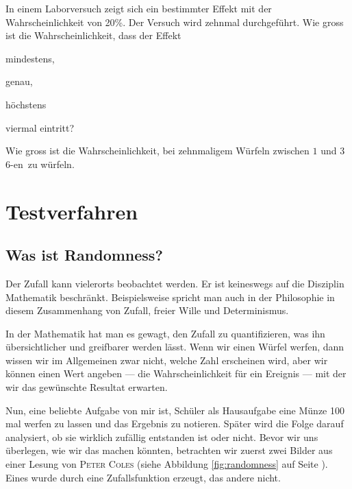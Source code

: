 \documentclass[%
11pt,%
twoside,%
titlepage,%
german,%
headsepline%
]{scrartcl}
\begin{document}
\begin{ueb}
In einem Laborversuch zeigt sich ein bestimmter Effekt mit der Wahrscheinlichkeit von 20\%. Der Versuch wird zehnmal durchgeführt. Wie gross ist die Wahrscheinlichkeit, dass der Effekt
\begin{enumeratea}
\item mindestens,
\item genau,
\item höchstens
\end{enumeratea}
viermal eintritt?
\end{ueb}

\begin{ueb}
Wie gross ist die Wahrscheinlichkeit, bei zehnmaligem Würfeln zwischen $1$ und $3$ \glqq $6$-en\grqq\ zu würfeln.
\end{ueb}

\clearpage

\section{Testverfahren}

\subsection{Was ist Randomness?}
Der Zufall kann vielerorts beobachtet werden. Er ist keineswegs auf die Disziplin Mathematik beschränkt. Beispielsweise spricht man auch in der Philosophie in diesem Zusammenhang von Zufall, freier Wille und Determinismus.

In der Mathematik hat man es gewagt, den Zufall zu quantifizieren, was ihn über\-sich\-tli\-cher und greifbarer werden lässt. Wenn wir einen Würfel werfen, dann wissen wir im Allgemeinen zwar nicht, welche Zahl erscheinen wird, aber wir können einen Wert angeben --- die Wahrscheinlichkeit für ein Ereignis --- mit der wir das gewünschte Resultat erwarten.

Nun, eine beliebte Aufgabe von mir ist, Schüler als Hausaufgabe eine Münze 100 mal werfen zu lassen und das Ergebnis zu notieren. Später wird die Folge darauf analysiert, ob sie wirklich zufällig entstanden ist oder nicht. Bevor wir uns überlegen, wie wir das machen könnten, betrachten wir zuerst zwei Bilder aus einer Lesung von \textsc{Peter Coles} (siehe Abbildung \ref{fig:randomness} auf Seite \pageref{fig:randomness}). Eines wurde durch eine Zufallsfunktion erzeugt, das andere nicht.  
\end{document}

